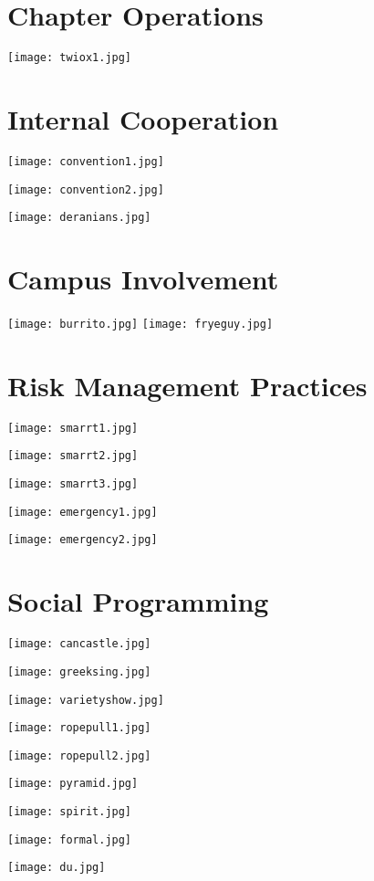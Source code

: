   \section{Chapter Operations}
    \texttt{[image: twiox1.jpg]}
    
    
    
  
  \section{Internal Cooperation}
    \texttt{[image: convention1.jpg]}
    
    
    \texttt{[image: convention2.jpg]}
    
    
    \texttt{[image: deranians.jpg]}
    
  
  \section{Campus Involvement}
    \texttt{[image: burrito.jpg]}
    \texttt{[image: fryeguy.jpg]}
    
    
  \section{Risk Management Practices}
    
    
    
    
    \texttt{[image: smarrt1.jpg]}
    
    \texttt{[image: smarrt2.jpg]}
    
    \texttt{[image: smarrt3.jpg]}
    
    \texttt{[image: emergency1.jpg]}
    
    \texttt{[image: emergency2.jpg]}
  
  \section{Social Programming}
    \texttt{[image: cancastle.jpg]}
    
    \texttt{[image: greeksing.jpg]}
    
    \texttt{[image: varietyshow.jpg]}
    
    \texttt{[image: ropepull1.jpg]}
    
    \texttt{[image: ropepull2.jpg]}
    
    \texttt{[image: pyramid.jpg]}
    
    \texttt{[image: spirit.jpg]}

    \texttt{[image: formal.jpg]}
    
    \texttt{[image: du.jpg]}
    
    
    
    
    
    
    
    
